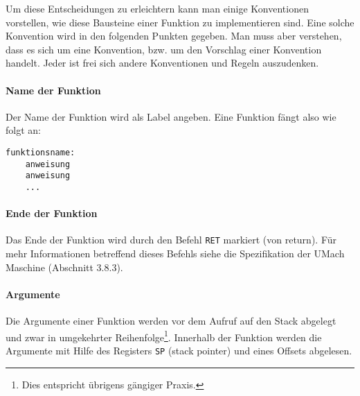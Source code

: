 Um diese Entscheidungen zu erleichtern kann man einige Konventionen vorstellen,
wie diese Bausteine einer Funktion zu implementieren sind. Eine solche
Konvention wird in den folgenden Punkten gegeben. Man muss aber verstehen, dass
es sich um eine Konvention, bzw. um den Vorschlag einer Konvention handelt.
Jeder ist frei sich andere Konventionen und Regeln auszudenken.

\paragraph{Name der Funktion}
Der Name der Funktion wird als Label angeben. Eine Funktion fängt also wie folgt
an:
\begin{lstlisting}
funktionsname:
    anweisung
    anweisung
    ...
\end{lstlisting}


\paragraph{Ende der Funktion}

Das Ende der Funktion wird durch den Befehl \texttt{RET} markiert (von
\glqq return\grqq). Für mehr Informationen betreffend dieses Befehls siehe die
Spezifikation der UMach Maschine (Abschnitt 3.8.3).


\paragraph{Argumente}

Die Argumente einer Funktion werden vor dem Aufruf auf den Stack abgelegt und
zwar in umgekehrter Reihenfolge\footnote{Dies entspricht übrigens gängiger
Praxis.}. Innerhalb der Funktion werden die Argumente mit Hilfe des Registers
\texttt{SP} (stack pointer) und eines Offsets abgelesen.

